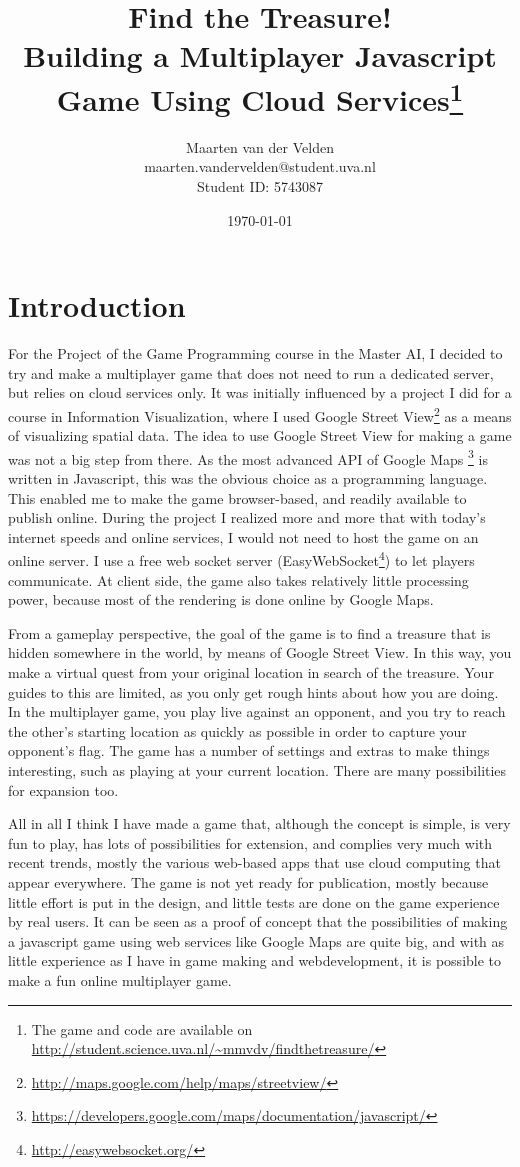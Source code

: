 \documentclass[a4paper,10pt]{article}
\title{Find the Treasure!\\Building a Multiplayer Javascript Game Using Cloud Services\footnote{The game and code are available on \url{http://student.science.uva.nl/\~mmvdv/findthetreasure/}}}
\author{Maarten van der Velden\\maarten.vandervelden@student.uva.nl\\Student ID: 5743087}
\date{\today}
\begin{document}
\maketitle

\section{Introduction} %
\label{sec:introduction}
For the Project of the Game Programming course in the Master AI, I decided to  try and make a multiplayer game that does not need to run a dedicated server, but relies on cloud services only. It was initially influenced by a project I did for a course in Information Visualization, where I used Google Street View\footnote{\url{http://maps.google.com/help/maps/streetview/}} as a means of visualizing spatial data. The idea to use Google Street View for making a game was not a big step from there. As the most advanced API of Google Maps \footnote{\url{https://developers.google.com/maps/documentation/javascript/}} is written in Javascript, this was the obvious choice as a programming language. This enabled me to make the game browser-based, and readily available to publish
online. During the project I realized more and more that with today's internet speeds and online services, I would not need to host the game on an online server. I use a free web socket server (EasyWebSocket\footnote{ \url{http://easywebsocket.org/}}) to let players communicate. At client side, the game also takes relatively little processing power, because most of the rendering is done online by Google Maps.

From a gameplay perspective, the goal of the game is to find a treasure that is hidden somewhere in the world, by means of Google Street View. In this way, you make a  virtual quest from your original location in search of the treasure. Your guides to this are limited, as you only get rough hints about how you are doing. In the multiplayer game, you play live against an opponent, and you try to reach the other's starting location as quickly as possible in order to capture your opponent's flag. The game has a number of settings and extras to make things interesting, such as playing at your current location. There are many possibilities for expansion too.

All in all I think I have made a game that, although the concept is simple, is very fun to play, has lots of possibilities for extension, and complies very much with recent trends, mostly the various web-based apps that use cloud computing that appear everywhere. The game is not yet ready for publication, mostly because little effort is put in the design, and little tests are done on the game experience by real users. It can be seen as a proof of concept that the possibilities of making a javascript game using web services like Google Maps are quite big, and with as little experience as I have in game making and webdevelopment, it is possible to make a fun online multiplayer game.
\end{document}

